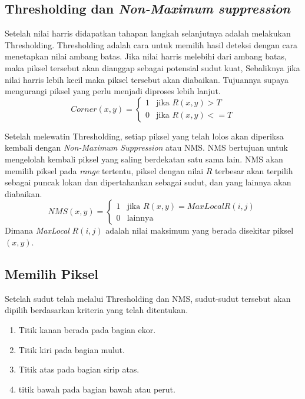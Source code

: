 \subsection{Thresholding dan \emph{Non-Maximum suppression}}
    Setelah nilai harris didapatkan tahapan langkah selanjutnya adalah melakukan Thresholding.
Thresholding adalah cara untuk memilih hasil deteksi dengan cara menetapkan nilai ambang batas.
Jika nilai harris melebihi dari ambang batas, maka piksel tersebut akan dianggap sebagai potensial sudut kuat, Sebaliknya jika nilai harris lebih kecil maka piksel tersebut akan diabaikan.
Tujuannya supaya mengurangi piksel yang perlu menjadi diproses lebih lanjut. 
\begin{equation}
    Corner(x,y) = 
    \begin{cases}  
        1 & \text{jika } R(x,y) > T \\ 
        0 & \text{jika } R(x,y) <= T
    \end{cases}
\end{equation}

    Setelah melewatin Thresholding, setiap piksel yang telah lolos akan diperiksa kembali dengan \emph{Non-Maximum Suppression} atau NMS.\@
NMS bertujuan untuk mengelolah kembali piksel yang saling berdekatan satu sama lain. NMS akan memilih piksel pada \emph{range} tertentu, piksel dengan nilai \(R\) terbesar akan terpilih sebagai puncak lokan dan dipertahankan sebagai sudut, dan yang lainnya akan diabaikan.
\begin{equation*}
    NMS(x,y) =
    \begin{cases}
        1 & \text{jika } R(x,y) = MaxLocal R(i,j) \\
        0 & \text{lainnya }
    \end{cases}
\end{equation*}
Dimana \emph{MaxLocal} \(R(i,j)\) adalah nilai maksimum yang berada disekitar piksel \((x,y)\).

\subsection{Memilih Piksel}
    Setelah sudut telah melalui Thresholding dan NMS, sudut-sudut tersebut akan dipilih berdasarkan kriteria yang telah ditentukan.
\begin{enumerate}
    \setlength{\parskip}{0pt}
    \item Titik kanan berada pada bagian ekor.
    \item Titik kiri pada bagian mulut.
    \item Titik atas pada bagian sirip atas.
    \item titik bawah pada bagian bawah atau perut.
\end{enumerate}

